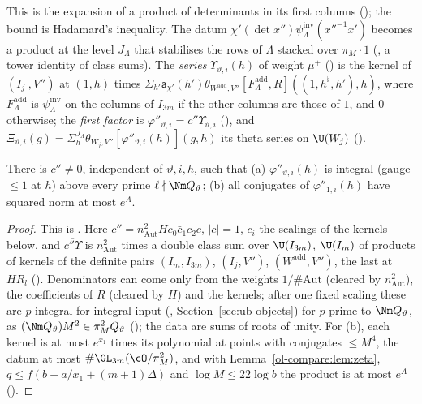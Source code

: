 This is the expansion of a product of determinants in its first columns
(); the bound is Hadamard's inequality.
The datum $\chi'(\det x'')\psi^{\mathrm{inv}}_\Lambda(x''^{-1}x')$ becomes a product at the level
$J_\Lambda$ that stabilises the rows of $\Lambda$ stacked over $\pi_M\cdot1$
(, a tower identity of class sums). The \emph{series}
$\Upsilon_{\vartheta,i}(h)$ of weight $\mu^+$ () is the kernel of
$(I_j^-,V'')$ at $(1,h)$ times
$\Sigma_{h'}\mathsf a_{\chi'}(h')\theta_{W^{\mathrm{add}},V''}[F^{\mathrm{add}}_\Lambda,R]((1,h^\flat,h'),h)$, where
$F^{\mathrm{add}}_\Lambda$ is $\psi^{\mathrm{inv}}_\Lambda$ on the columns of $I_{3m}$ if the other columns are those of $1$, and $0$ otherwise;
the \emph{first factor} is $\varphi''_{\vartheta,i}=\overline{c''\Upsilon_{\vartheta,i}}$
(), and $\Xi_{\vartheta,i}(g)=\Sigma^{J_\Lambda}_h\theta_{W_j,V''}[\overline{\varphi''_{\vartheta,i}(h)}](g,h)$
its theta series on $\U(W_j)$ ().

\begin{proposition}\label{ol-compare:prop:first}
There is $c''\ne0$, independent of $\vartheta,i,h$, such that (a) $\varphi''_{\vartheta,i}(h)$ is integral
(gauge $\le1$ at $h$) above every prime $\ell\nmid\Nm Q_\vartheta$; (b) all conjugates of
$\varphi''_{1,i}(h)$ have squared norm at most $e^A$.
\end{proposition}

\begin{proof}
This is . Here $c''=n_{\mathrm{Aut}}^2Hc_0\bar c_1c_2c$, $|c|=1$, $c_i$ the
scalings of the kernels below, and $\overline{c''\Upsilon}$ is $n_{\mathrm{Aut}}^2$ times a double
class sum over $\U(I_{3m})$, $\U(I_m)$ of products of kernels of the definite pairs $(I_m,I_{3m})$,
$(I_j,V'')$, $(W^{\mathrm{add}},V'')$, the last at $HR_l$
(). Denominators can come only from the weights
$1/\#\mathrm{Aut}$ (cleared by $n_{\mathrm{Aut}}^2$), the coefficients of $R$ (cleared by $H$) and
the kernels; after one fixed scaling these are $p$-integral for integral input
(, Section~\ref{sec:ub-objects}) for $p$ prime to
$\Nm Q_\vartheta$, as $(\Nm Q_\vartheta)M^2\in\pi_M^2Q_\vartheta$ ();
the data are sums of roots of unity. For (b), each kernel is at most $e^{x_1}$ times its polynomial
at points with conjugates $\le M^4$, the datum at most $\#\GL_{3m}(\cO/\pi_M^2)$, and with
Lemma~\ref{ol-compare:lem:zeta}, $q\le f(b+a/x_1+(m+1)\Delta)$ and $\log M\le22\log b$ the product is at most
$e^A$ ().
\end{proof}

